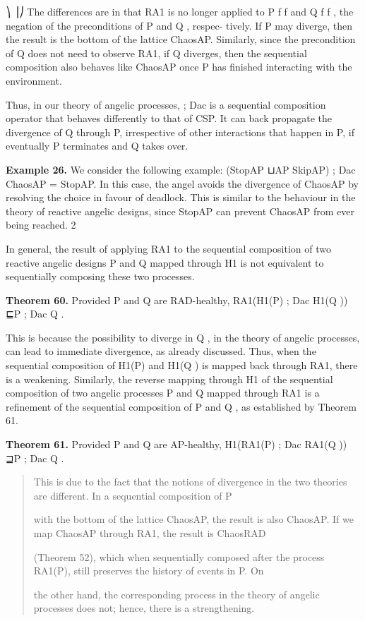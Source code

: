 \documentclass[11pt]{article}
\begin{document}
⎞ ⎟⎠ The differences are in that RA1 is no longer applied to P f f and Q f f , the negation of the preconditions of P and Q , respec- tively. If P may diverge, then the result is the bottom of the lattice ChaosAP. Similarly, since the precondition of Q does not need to observe RA1, if Q diverges, then the sequential composition also behaves like ChaosAP once P has finished interacting with the environment.

Thus, in our theory of angelic processes, ; Dac is a sequential composition operator that behaves differently to that of CSP. It can back propagate the divergence of Q through P, irrespective of other interactions that happen in P, if eventually P terminates and Q takes over.

\noindent\textbf{Example 26.} We consider the following example: (StopAP ⊔AP SkipAP) ; Dac ChaosAP = StopAP. In this case, the angel avoids the divergence of ChaosAP by resolving the choice in favour of deadlock. This is similar to the behaviour in the theory of reactive angelic designs, since StopAP can prevent ChaosAP from ever being reached. 2


In general, the result of applying RA1 to the sequential composition of two reactive angelic designs P and Q mapped through H1 is not equivalent to sequentially composing these two processes.

\noindent\textbf{Theorem 60.} Provided P and Q are RAD-healthy, RA1(H1(P) ; Dac H1(Q )) ⊑P ; Dac Q .


This is because the possibility to diverge in Q , in the theory of angelic processes, can lead to immediate divergence, as already discussed. Thus, when the sequential composition of H1(P) and H1(Q ) is mapped back through RA1, there is a weakening. Similarly, the reverse mapping through H1 of the sequential composition of two angelic processes P and Q mapped through RA1 is a refinement of the sequential composition of P and Q , as established by Theorem 61.

\noindent\textbf{Theorem 61.} Provided P and Q are AP-healthy, H1(RA1(P) ; Dac RA1(Q )) ⊒P ; Dac Q .


\begin{quote}\small\raggedright
This is due to the fact that the notions of divergence in the two theories are different. In a sequential composition of P
\par
with the bottom of the lattice ChaosAP, the result is also ChaosAP. If we map ChaosAP through RA1, the result is ChaosRAD
\par
(Theorem 52), which when sequentially composed after the process RA1(P), still preserves the history of events in P. On
\par
the other hand, the corresponding process in the theory of angelic processes does not; hence, there is a strengthening.
\end{quote}
\end{document}
